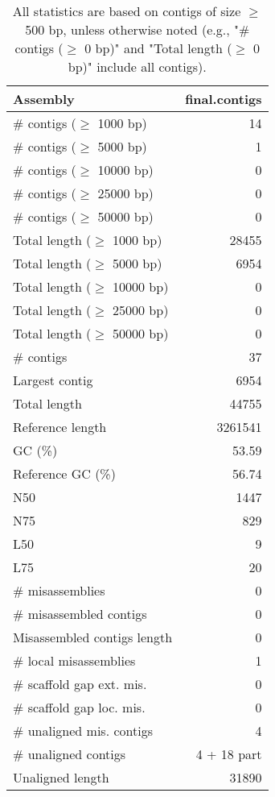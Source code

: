 \documentclass[12pt,a4paper]{article}
\begin{document}
\begin{table}[ht]
\begin{center}
\caption{All statistics are based on contigs of size $\geq$ 500 bp, unless otherwise noted (e.g., "\# contigs ($\geq$ 0 bp)" and "Total length ($\geq$ 0 bp)" include all contigs).}
\begin{tabular}{|l*{1}{|r}|}
\hline
Assembly & final.contigs \\ \hline
\# contigs ($\geq$ 1000 bp) & 14 \\ \hline
\# contigs ($\geq$ 5000 bp) & 1 \\ \hline
\# contigs ($\geq$ 10000 bp) & 0 \\ \hline
\# contigs ($\geq$ 25000 bp) & 0 \\ \hline
\# contigs ($\geq$ 50000 bp) & 0 \\ \hline
Total length ($\geq$ 1000 bp) & 28455 \\ \hline
Total length ($\geq$ 5000 bp) & 6954 \\ \hline
Total length ($\geq$ 10000 bp) & 0 \\ \hline
Total length ($\geq$ 25000 bp) & 0 \\ \hline
Total length ($\geq$ 50000 bp) & 0 \\ \hline
\# contigs & 37 \\ \hline
Largest contig & 6954 \\ \hline
Total length & 44755 \\ \hline
Reference length & 3261541 \\ \hline
GC (\%) & 53.59 \\ \hline
Reference GC (\%) & 56.74 \\ \hline
N50 & 1447 \\ \hline
N75 & 829 \\ \hline
L50 & 9 \\ \hline
L75 & 20 \\ \hline
\# misassemblies & 0 \\ \hline
\# misassembled contigs & 0 \\ \hline
Misassembled contigs length & 0 \\ \hline
\# local misassemblies & 1 \\ \hline
\# scaffold gap ext. mis. & 0 \\ \hline
\# scaffold gap loc. mis. & 0 \\ \hline
\# unaligned mis. contigs & 4 \\ \hline
\# unaligned contigs & 4 + 18 part \\ \hline
Unaligned length & 31890 \\ \hline

\end{tabular}
\end{center}
\end{table}
\end{document}
